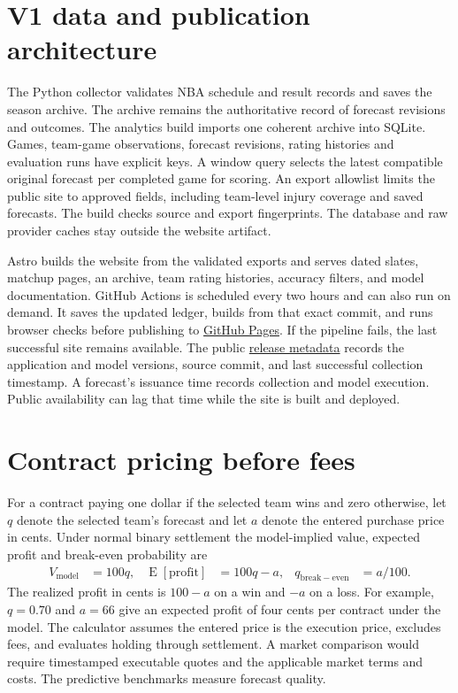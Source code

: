 \documentclass[11pt]{article}
\begin{document}
\section{V1 data and publication architecture}
The Python collector validates NBA schedule and result records and saves
the season archive. The archive remains the authoritative record of
forecast revisions and outcomes. The analytics build imports one
coherent archive into SQLite. Games, team-game observations, forecast
revisions, rating histories and evaluation runs have explicit keys.
A window query selects the latest compatible original forecast per
completed game for scoring. An export allowlist limits the public site to
approved fields, including team-level injury coverage and saved forecasts.
The build checks source and export fingerprints. The database and
raw provider caches stay outside the website artifact.

Astro builds the website from the validated exports and serves dated
slates, matchup pages, an archive, team rating histories, accuracy
filters, and model documentation. GitHub Actions is scheduled every two
hours and can also run on demand. It saves the updated ledger, builds
from that exact commit, and runs browser checks before publishing to
\href{https://eshangark.github.io/parallax-nba/}{GitHub Pages}. If the
pipeline fails, the last successful site remains available. The public
\href{https://eshangark.github.io/parallax-nba/release.json}{release
metadata} records the application and model versions, source commit,
and last successful collection timestamp. A forecast's issuance time
records collection and model execution. Public availability can lag
that time while the site is built and deployed.

\section{Contract pricing before fees}
For a contract paying one dollar if the selected team wins and zero
otherwise, let $q$ denote the selected team's forecast and let $a$
denote the entered purchase price in cents. Under normal binary
settlement the model-implied value, expected profit and break-even
probability are
\begin{align}
 V_{\mathrm{model}} &= 100q, &
 \operatorname{E}[\mathrm{profit}] &= 100q-a, &
 q_{\mathrm{break-even}} &= a/100.
\end{align}
The realized profit in cents is $100-a$ on a win and $-a$ on a loss.
For example, $q=0.70$ and $a=66$ give an expected profit of four cents
per contract under the model. The calculator assumes the entered price
is the execution price, excludes fees, and evaluates holding through
settlement. A market comparison would require timestamped executable
quotes and the applicable market terms and costs. The predictive
benchmarks measure forecast quality.
\end{document}

